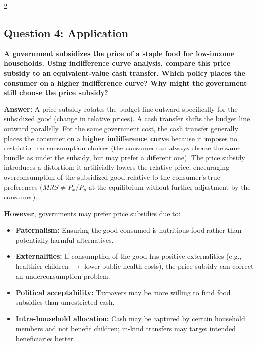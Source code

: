 \documentclass[10pt,a4paper]{article}
\begin{document}
\begin{multicols}{2}
\vspace{0.2cm}

\subsection*{Question 4: Application}
\textbf{A government subsidizes the price of a staple food for low-income households. Using indifference curve analysis, compare this price subsidy to an equivalent-value cash transfer. Which policy places the consumer on a higher indifference curve? Why might the government still choose the price subsidy?}

\textbf{Answer:} A price subsidy rotates the budget line outward specifically for the subsidized good (change in relative prices). A cash transfer shifts the budget line outward parallelly. For the same government cost, the cash transfer generally places the consumer on a \textbf{higher indifference curve} because it imposes no restriction on consumption choices (the consumer can always choose the same bundle as under the subsidy, but may prefer a different one). The price subsidy introduces a distortion: it artificially lowers the relative price, encouraging overconsumption of the subsidized good relative to the consumer's true preferences ($MRS \neq P_x/P_y$ at the equilibrium without further adjustment by the consumer).

\textbf{However}, governments may prefer price subsidies due to:
\begin{itemize}[nosep]
    \item \textbf{Paternalism:} Ensuring the good consumed is nutritious food rather than potentially harmful alternatives.
    \item \textbf{Externalities:} If consumption of the good has positive externalities (e.g., healthier children $\to$ lower public health costs), the price subsidy can correct an underconsumption problem.
    \item \textbf{Political acceptability:} Taxpayers may be more willing to fund food subsidies than unrestricted cash.
    \item \textbf{Intra-household allocation:} Cash may be captured by certain household members and not benefit children; in-kind transfers may target intended beneficiaries better.
\end{itemize}

\end{multicols}
\end{document}

